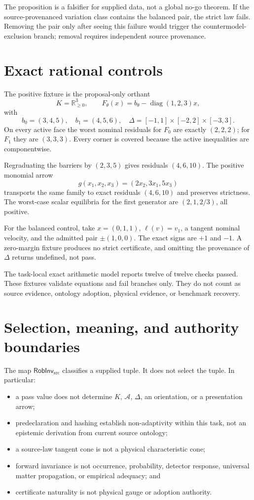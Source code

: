 \documentclass[11pt]{article}
\newcommand{\R}{\mathbb R}
\newcommand{\RobInv}{\mathsf{RobInv}_{\mathrm{src}}}
\newcommand{\status}[1]{\textsf{#1}}
\begin{document}
The proposition is a falsifier for supplied data, not a global no-go theorem.
If the source-provenanced variation class contains the balanced pair, the
strict law fails.  Removing the pair only after seeing this failure would
trigger the countermodel-exclusion branch; removal requires independent
source provenance.

\section{Exact rational controls}

The positive fixture is the proposal-only orthant
\[
 K=\R_{\geq0}^3,
 \qquad
 F_\theta(x)=b_\theta-\operatorname{diag}(1,2,3)x,
\]
with
\[
 b_0=(3,4,5),\quad b_1=(4,5,6),\quad
 \Delta=[-1,1]\times[-2,2]\times[-3,3].
\]
On every active face the worst nominal residuals for \(F_0\) are exactly
\((2,2,2)\); for \(F_1\) they are \((3,3,3)\).  Every corner is covered
because the active inequalities are componentwise.

Regraduating the barriers by \((2,3,5)\) gives residuals
\((4,6,10)\).  The positive monomial arrow
\[
 g(x_1,x_2,x_3)=(2x_2,3x_1,5x_3)
\]
transports the same family to exact residuals \((4,6,10)\) and preserves
strictness.  The worst-case scalar
equilibria for the first generator are \((2,1,2/3)\), all positive.

For the balanced control, take \(x=(0,1,1)\),
\(\ell(v)=v_1\), a tangent nominal velocity, and the admitted pair
\(\pm(1,0,0)\).  The exact signs are \(+1\) and \(-1\).  A zero-margin
fixture produces no strict certificate, and omitting the provenance of
\(\Delta\) returns \status{undefined}, not pass.

The task-local exact arithmetic model reports twelve of twelve checks passed.
These fixtures validate equations and fail branches only.  They do not count
as source evidence, ontology adoption, physical evidence, or benchmark
recovery.

\section{Selection, meaning, and authority boundaries}

The map \(\RobInv\) classifies a supplied tuple.  It does not select the
tuple.  In particular:
\begin{itemize}
  \item a pass value does not determine \(K\), \(\mathcal A\), \(\Delta\),
  an orientation, or a presentation arrow;
  \item predeclaration and hashing establish non-adaptivity within this task,
  not an epistemic derivation from current source ontology;
  \item a source-law tangent cone is not a physical characteristic cone;
  \item forward invariance is not occurrence, probability, detector
  response, universal matter propagation, or empirical adequacy; and
  \item certificate naturality is not physical gauge or adoption authority.
\end{itemize}
\end{document}
